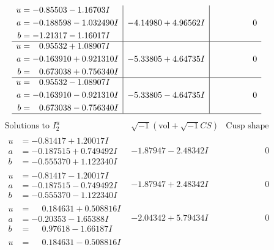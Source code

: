 \documentclass[1p]{elsarticle_modified}
\theoremstyle{definition}
\newcommand{\I}{\sqrt{-1}}
\begin{document}
$$\begin{array}{c|c|c}
\begin{aligned}
u &= -0.85503 - 1.16703 I \\
a &= -0.188598 - 1.032490 I \\
b &= -1.21317 - 1.16017 I\end{aligned}
 & -4.14980 + 4.96562 I & \phantom{-0.000000 } 0 \\ \hline\begin{aligned}
u &= \phantom{-}0.95532 + 1.08907 I \\
a &= -0.163910 + 0.921310 I \\
b &= \phantom{-}0.673038 + 0.756340 I\end{aligned}
 & -5.33805 + 4.64735 I & \phantom{-0.000000 } 0 \\ \hline\begin{aligned}
u &= \phantom{-}0.95532 - 1.08907 I \\
a &= -0.163910 - 0.921310 I \\
b &= \phantom{-}0.673038 - 0.756340 I\end{aligned}
 & -5.33805 - 4.64735 I & \phantom{-0.000000 } 0\\
 \hline 
 \end{array}$$\newpage$$\begin{array}{c|c|c}  
\text{Solutions to }I^u_{2}& \I (\text{vol} + \sqrt{-1}CS) & \text{Cusp shape}\\
 \hline 
\begin{aligned}
u &= -0.81417 + 1.20017 I \\
a &= -0.187515 + 0.749492 I \\
b &= -0.555370 + 1.122340 I\end{aligned}
 & -1.87947 - 2.48342 I & \phantom{-0.000000 } 0 \\ \hline\begin{aligned}
u &= -0.81417 - 1.20017 I \\
a &= -0.187515 - 0.749492 I \\
b &= -0.555370 - 1.122340 I\end{aligned}
 & -1.87947 + 2.48342 I & \phantom{-0.000000 } 0 \\ \hline\begin{aligned}
u &= \phantom{-}0.184631 + 0.508816 I \\
a &= -0.20353 - 1.65388 I \\
b &= \phantom{-}0.97618 - 1.66187 I\end{aligned}
 & -2.04342 + 5.79434 I & \phantom{-0.000000 } 0 \\ \hline\begin{aligned}
u &= \phantom{-}0.184631 - 0.508816 I \\

\end{aligned}
\end{array}$$
\end{document}

